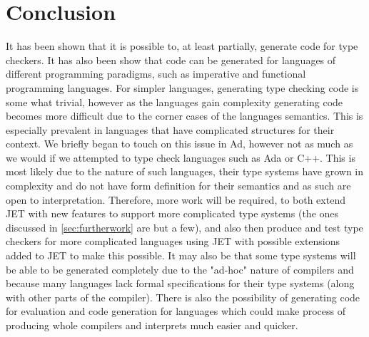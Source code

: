 \section{Conclusion}
It has been shown that it is possible to, at least partially, generate code for type checkers.
It has also been show that code can be generated for languages of different programming paradigms, such as imperative and functional programming languages.
For simpler languages, generating type checking code is some what trivial, however as the languages gain complexity generating code becomes more difficult due to the corner cases of the languages semantics.
This is especially prevalent in languages that have complicated structures for their context.
We briefly began to touch on this issue in Ad, however not as much as we would if we attempted to type check languages such as Ada or C++.
This is most likely due to the nature of such languages, their type systems have grown in complexity and do not have form definition for their semantics and as such are open to interpretation.
Therefore, more work will be required, to both extend JET with new features to support more complicated type systems (the ones discussed in \autoref{sec:furtherwork} are but a few), and also then produce and test type checkers for more complicated languages using JET with possible extensions added to JET to make this possible.
It may also be that some type systems will be able to be generated completely due to the "ad-hoc" nature of compilers and because many languages lack formal specifications for their type systems (along with other parts of the compiler).
There is also the possibility of generating code for evaluation and code generation for languages which could make process of producing whole compilers and interprets much easier and quicker.
